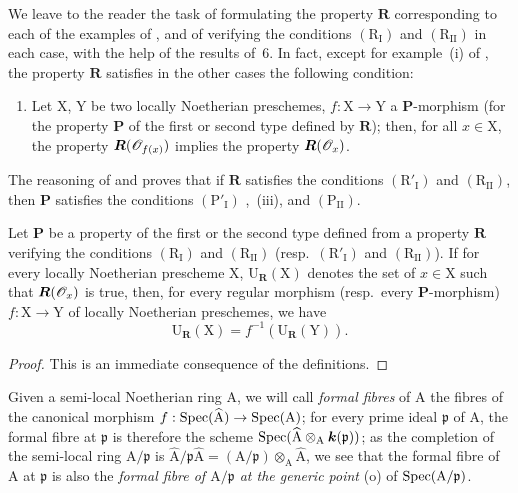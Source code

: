 \begin{remark}[7.3.11]
\label{IV.7.3.11}
We leave to the reader the task of formulating the property $\boldsymbol{R}$ corresponding to each of the examples of , and of verifying the conditions $(\mathrm{R_I})$ and $(\mathrm{R_{II}})$ in each case, with the help of the results of \textsection\,6.
In fact, except for example~(i) of , the property $\boldsymbol{R}$ satisfies in the other cases the following condition:
\begin{enumerate}
  \item[$(\mathrm{R}'_\mathrm{I})$] Let $\mathrm{X}$, $\mathrm{Y}$ be two locally Noetherian preschemes, $f:\mathrm{X}\to\mathrm{Y}$ a $\boldsymbol{P}$-morphism (for the property $\boldsymbol{P}$ of the first or second type defined by $\boldsymbol{R}$); then, for all $x\in\mathrm{X}$, the property $\boldsymbol{R}(\mathscr{O}_{f(x)})$ implies the property $\boldsymbol{R}(\mathscr{O}_x)$.
\end{enumerate}
The reasoning of  and  proves that if $\boldsymbol{R}$ satisfies the conditions $(\mathrm{R}'_\mathrm{I})$ and $(\mathrm{R_{II}})$, then $\boldsymbol{P}$ satisfies the conditions $(\mathrm{P'_I})$ ,~(iii), and $(\mathrm{P_{II}})$.
\end{remark}

\begin{proposition}[7.3.12]
\label{IV.7.3.12}
Let $\boldsymbol{P}$ be a property of the first or the second type defined from a property $\boldsymbol{R}$ verifying the conditions $(\mathrm{R_I})$ and $(\mathrm{R_{II}})$ (resp.~$(\mathrm{R}'_\mathrm{I})$ and $(\mathrm{R_{II}})$).
If for every locally Noetherian prescheme $\mathrm{X}$, $\mathrm{U}_{\boldsymbol{R}}(\mathrm{X})$ denotes the set of $x\in\mathrm{X}$ such that $\boldsymbol{R}(\mathscr{O}_x)$ is true, then, for every regular morphism (resp.~every $\boldsymbol{P}$-morphism) $f:\mathrm{X}\to\mathrm{Y}$ of locally Noetherian preschemes, we have
\[
  \mathrm{U}_{\boldsymbol{R}}(\mathrm{X})=f^{-1}(\mathrm{U}_{\boldsymbol{R}}(\mathrm{Y})).
  \tag{7.3.12.1}
\label{IV.7.3.12.1}
\]
\end{proposition}

\begin{proof}
This is an immediate consequence of the definitions.
\end{proof}

\begin{env}[7.3.13]
\label{IV.7.3.13}
Given a semi-local Noetherian ring $\mathrm{A}$, we will call \emph{formal fibres} of $\mathrm{A}$ the fibres of the canonical morphism $f:\operatorname{Spec}(\widehat{\mathrm{A}})\to\operatorname{Spec}(\mathrm{A})$; for every prime ideal $\mathfrak{p}$ of $\mathrm{A}$, the formal fibre at $\mathfrak{p}$ is therefore the scheme $\operatorname{Spec}(\widehat{\mathrm{A}}\otimes_\mathrm{A}\boldsymbol{k}(\mathfrak{p}))$; as the completion of the semi-local ring $\mathrm{A}/\mathfrak{p}$ is $\widehat{\mathrm{A}}/\mathfrak{p}\widehat{\mathrm{A}}=(\mathrm{A}/\mathfrak{p})\otimes_\mathrm{A}\widehat{\mathrm{A}}$, we see that the formal fibre of $\mathrm{A}$ at $\mathfrak{p}$ is also the \emph{formal fibre of $\mathrm{A}/\mathfrak{p}$ at the generic point} (o) of $\operatorname{Spec}(\mathrm{A}/\mathfrak{p})$.
\end{env}


